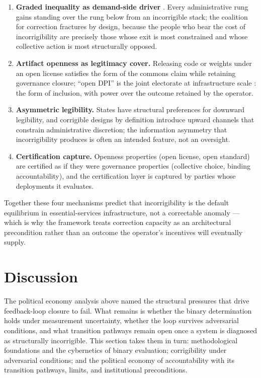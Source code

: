 \documentclass{article}
\begin{document}
\begin{enumerate}[noitemsep]
    \item \textbf{Graded inequality as demand-side driver} \citep{ambedkar1936annihilation}. Every administrative rung gains standing over the rung below from an incorrigible stack; the coalition for correction fractures by design, because the people who bear the cost of incorrigibility are precisely those whose exit is most constrained and whose collective action is most structurally opposed.
    \item \textbf{Artifact openness as legitimacy cover.} Releasing code or weights under an open license satisfies the form of the commons claim while retaining governance closure; ``open DPI'' is the joint electorate at infrastructure scale \citep{ambedkar1945congress}: the form of inclusion, with power over the outcome retained by the operator.
    \item \textbf{Asymmetric legibility.} States have structural preferences for downward legibility, and corrigible designs by definition introduce upward channels that constrain administrative discretion; the information asymmetry that incorrigibility produces is often an intended feature, not an oversight.
    \item \textbf{Certification capture.} Openness properties (open license, open standard) are certified as if they were governance properties (collective choice, binding accountability), and the certification layer is captured by parties whose deployments it evaluates.
\end{enumerate}

Together these four mechanisms predict that incorrigibility is the default equilibrium in essential-services infrastructure, not a correctable anomaly --- which is why the framework treats correction capacity as an architectural precondition rather than an outcome the operator's incentives will eventually supply.

\section{Discussion}
\label{sec:discussion}

The political economy analysis above named the structural pressures that drive feedback-loop closure to fail. What remains is whether the binary determination holds under measurement uncertainty, whether the loop survives adversarial conditions, and what transition pathways remain open once a system is diagnosed as structurally incorrigible. This section takes them in turn: methodological foundations and the cybernetics of binary evaluation; corrigibility under adversarial conditions; and the political economy of accountability with its transition pathways, limits, and institutional preconditions.
\end{document}
